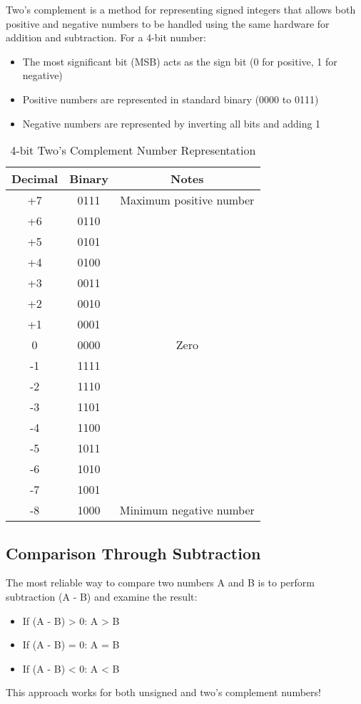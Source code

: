\documentclass[12pt]{betterjournal}
\begin{document}
Two's complement is a method for representing signed integers that allows both positive and negative numbers to be handled using the same hardware for addition and subtraction. For a 4-bit number:
\begin{itemize}
    \item The most significant bit (MSB) acts as the sign bit (0 for positive, 1 for negative)
    \item Positive numbers are represented in standard binary (0000 to 0111)
    \item Negative numbers are represented by inverting all bits and adding 1
\end{itemize}

\begin{table}[H]
    \centering
    \begin{tabular}{|c|c|c|}
    \hline
    \textbf{Decimal} & \textbf{Binary} & \textbf{Notes} \\
    \hline
    +7 & 0111 & Maximum positive number \\
    +6 & 0110 & \\
    +5 & 0101 & \\
    +4 & 0100 & \\
    +3 & 0011 & \\
    +2 & 0010 & \\
    +1 & 0001 & \\
    0 & 0000 & Zero \\
    -1 & 1111 & \\
    -2 & 1110 & \\
    -3 & 1101 & \\
    -4 & 1100 & \\
    -5 & 1011 & \\
    -6 & 1010 & \\
    -7 & 1001 & \\
    -8 & 1000 & Minimum negative number \\
    \hline
    \end{tabular}
    \caption{4-bit Two's Complement Number Representation}
    \label{tab:twos_complement}
\end{table}

\subsection{Comparison Through Subtraction}

\begin{important}[frametitle={Key Concept}]
The most reliable way to compare two numbers A and B is to perform subtraction (A - B) and examine the result:
\begin{itemize}
    \item If (A - B) > 0: A > B
    \item If (A - B) = 0: A = B
    \item If (A - B) < 0: A < B
\end{itemize}
This approach works for both unsigned and two's complement numbers!
\end{important}
\end{document}

